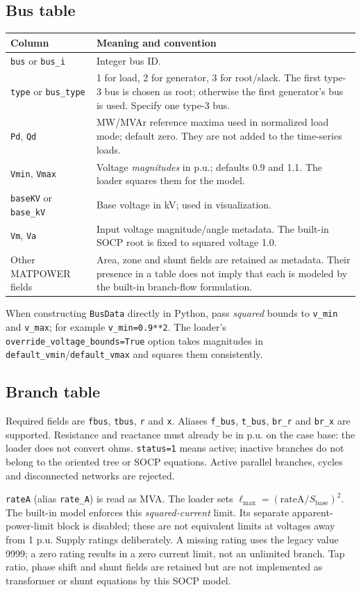 \documentclass[11pt,a4paper]{article}
\newcommand{\code}[1]{\nolinkurl{#1}}
\begin{document}
\subsection{Bus table}
\begin{longtable}{p{.27\linewidth}p{.65\linewidth}}
\toprule Column & Meaning and convention \\\midrule\endhead
\code{bus} or \code{bus_i} & Integer bus ID.\\
\code{type} or \code{bus_type} & 1 for load, 2 for generator, 3 for root/slack. The first type-3 bus is chosen as root; otherwise the first generator's bus is used. Specify one type-3 bus.\\
\code{Pd}, \code{Qd} & MW/MVAr reference maxima used in normalized load mode; default zero. They are not added to the time-series loads.\\
\code{Vmin}, \code{Vmax} & Voltage \emph{magnitudes} in p.u.; defaults 0.9 and 1.1. The loader squares them for the model.\\
\code{baseKV} or \code{base_kV} & Base voltage in kV; used in visualization.\\
\code{Vm}, \code{Va} & Input voltage magnitude/angle metadata. The built-in SOCP root is fixed to squared voltage 1.0.\\
Other MATPOWER fields & Area, zone and shunt fields are retained as metadata. Their presence in a table does not imply that each is modeled by the built-in branch-flow formulation.\\
\bottomrule
\end{longtable}
When constructing \code{BusData} directly in Python, pass \emph{squared}
bounds to \code{v_min} and \code{v_max}; for example \code{v_min=0.9**2}.
The loader's \code{override_voltage_bounds=True} option takes magnitudes in
\code{default_vmin}/\code{default_vmax} and squares them consistently.

\subsection{Branch table}
Required fields are \code{fbus}, \code{tbus}, \code{r} and \code{x}.
Aliases \code{f_bus}, \code{t_bus}, \code{br_r} and \code{br_x} are supported.
Resistance and reactance must already be in p.u. on the case base: the loader
does not convert ohms. \code{status=1} means active; inactive branches do not
belong to the oriented tree or SOCP equations. Active parallel branches,
cycles and disconnected networks are rejected.

\code{rateA} (alias \code{rate_A}) is read as MVA. The loader sets
\(\ell_{\max}=(\mathrm{rateA}/S_{\mathrm{base}})^2\).
The built-in model enforces this \emph{squared-current} limit. Its separate
apparent-power-limit block is disabled; these are not equivalent limits at
voltages away from 1 p.u. Supply ratings deliberately. A missing rating uses
the legacy value 9999; a zero rating results in a zero current limit, not an
unlimited branch. Tap ratio, phase shift and shunt fields are retained but
are not implemented as transformer or shunt equations by this SOCP model.
\end{document}
